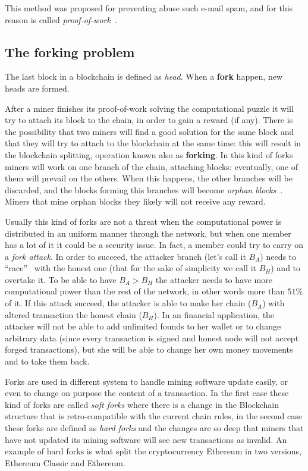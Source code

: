 This method was proposed for preventing abuse such e-mail spam, and for this
reason is called \textit{proof-of-work}~\cite{back02}.

\subsection{The forking problem}
\label{sub:tfp}

The last block in a blockchain is defined as \textit{head}. When a
\textbf{fork} happen, new heads are formed.

After a miner finishes its proof-of-work solving the computational puzzle
it will try to attach its block to the chain, in order to gain a reward (if
any). There is the possibility that two miners will find a good solution for
the same block and that they will try to attach to the blockchain at the same
time: this will result in the blockchain splitting, operation known also as
\textbf{forking}. In this kind of forks miners will work on one branch of the
chain, attaching blocks: eventually, one of them will prevail on the others.
When this happens, the other branches will be discarded, and the blocks
forming this branches will become \textit{orphan blocks}~\cite{decker13}.
Miners that mine orphan blocks they likely will not receive any reward.

Usually this kind of forks are not a threat when the computational power is
distributed in an uniform manner through the network, but when one member has a
lot of it it could be a security issue. In fact, a member could try to carry on
a \textit{fork attack}. In order to succeed, the attacker branch (let's call it
$B_A$) needs to ``race''~\cite{nakamoto08} with the honest one (that for the
sake of simplicity we call it $B_H$) and to overtake it. To be able to have
$B_A > B_H$ the attacker needs to have more computational power than the rest of
the network, in other words more than $51\%$ of it.
If this attack succeed, the attacker is able to make her chain ($B_A$) with
altered transaction the honest chain ($B_H$).
In an financial application, the attacker will not be able to add unlimited
founds to her wallet or to change arbitrary data (since every transaction is
signed and honest node will not accept forged transactions), but she will be
able to change her own money movements and to take them back.

Forks are used in different system to handle mining software update easily, or
even to change on purpose the content of a transaction\cite{sok15}. In the
first case these kind of forks are called \textit{soft forks} where there is a
change in the Blockchain structure that is retro-compatible with the current
chain rules, in the second case these forks are defined as \textit{hard forks}
and the changes are so deep that miners that have not updated its mining
software will see new transactions as invalid. An example of hard forks is what
split the cryptocurrency Ethereum in two versions, Ethereum Classic and
Ethereum.
